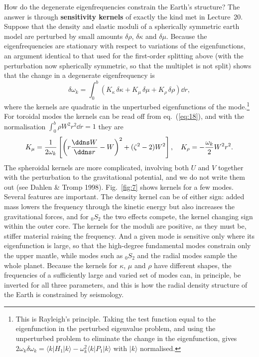 How do the degenerate eigenfrequencies constrain the Earth's structure? The answer is through \textbf{sensitivity kernels} 
of exactly the kind met in Lecture~20. Suppose that the density and elastic moduli of a spherically symmetric earth model are 
perturbed by small amounts $\delta\rho$, $\delta\kappa$ and $\delta\mu$. Because the eigenfrequencies are stationary with respect to 
variations of the eigenfunctions, an argument identical to that used for the first-order splitting above (with the perturbation 
now spherically symmetric, so that the multiplet is not split) shows that the change in a degenerate eigenfrequency is
\begin{equation}\label{eq:29a}
\delta\omega_{k}=\int_{0}^{b}\left(K_{\kappa}\,\delta\kappa+K_{\mu}\,\delta\mu+K_{\rho}\,\delta\rho\right)\dd r,
\end{equation}
where the kernels are quadratic in the unperturbed eigenfunctions of the mode.\footnote{This is Rayleigh's principle. Taking 
the test function equal to the eigenfunction in the perturbed eigenvalue problem, and using the unperturbed problem to 
eliminate the change in the eigenfunction, gives 
$2\omega_{k}\delta\omega_{k}=\langle k|H_{1}|k\rangle-\omega_{k}^{2}\langle k|P_{1}|k\rangle$ 
with $|k\rangle$ normalised.} For toroidal modes the kernels can be read off from eq.~(\ref{eq:18}), and with the normalisation 
$\int_{0}^{b}\rho W^{2}r^{2}\dd r=1$ they are
\begin{equation}\label{eq:29b}
K_{\mu}=\frac{1}{2\omega_{k}}\left[\left(r\frac{\ddns W}{\ddns r}-W\right)^{2}+(\zeta^{2}-2)W^{2}\right], \quad 
K_{\rho}=-\frac{\omega_{k}}{2}W^{2}r^{2}.
\end{equation}
The spheroidal kernels are more complicated, involving both $U$ and $V$ together with the perturbation to the gravitational 
potential, and we do not write them out (see Dahlen \& Tromp 1998). Fig.~\ref{fig:7} shows kernels for a few modes. Several features are important. 
The density kernel can be of either sign: added mass lowers the frequency through the kinetic energy but also increases 
the gravitational forces, and for ${}_{0}S_{2}$ the two effects compete, the kernel changing sign within the outer core. The kernels for the 
moduli are positive, as they must be, stiffer material raising the frequency. And a given mode is sensitive only where its 
eigenfunction is large, so that the high-degree fundamental modes constrain only the upper mantle, while modes such as 
${}_{0}S_{2}$ and the radial modes sample the whole planet. Because the kernels for $\kappa$, $\mu$ and $\rho$ have 
different shapes, the frequencies of a sufficiently large and varied set of modes can, in principle, be inverted for all three parameters, and 
this is how the radial density structure of the Earth is constrained by seismology.

